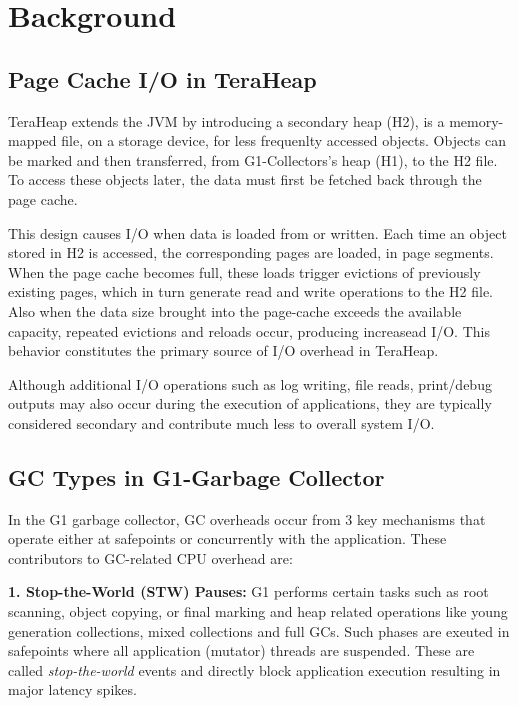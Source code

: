 \section{Background}


\subsection{Page Cache I/O in TeraHeap}


TeraHeap extends the JVM by introducing a secondary heap (H2), is a memory-mapped file,
on a storage device, for less frequenlty accessed objects.
Objects can be marked and then transferred, from G1-Collectors's heap (H1), to the H2 file.
To access these objects later, the data must first be fetched back through the page cache.

This design causes I/O when data is loaded from or written. Each time an object stored in H2 is
accessed, the corresponding pages are loaded, in page segments. When the page cache becomes full,
these loads trigger evictions of previously existing pages, which in turn
generate read and write operations to the H2 file. Also when the data size 
brought into the page-cache exceeds the available capacity, repeated evictions
and reloads occur, producing increasead I/O. This behavior constitutes the
primary source of I/O overhead in TeraHeap.

Although additional I/O operations such as log writing, file reads, print/debug
outputs may also occur during the execution of applications, they are typically
considered secondary and contribute much less to overall system I/O.

\subsection{GC Types in G1-Garbage Collector}
In the G1 garbage collector, GC overheads occur from 3 key
mechanisms that operate either at safepoints or concurrently with the application.
These contributors to GC-related CPU overhead are:

\textbf{1. Stop-the-World (STW) Pauses:}  
G1 performs certain tasks such as root scanning, object copying, or final marking and heap related operations
like young generation collections, mixed collections and full GCs. Such phases are exeuted in safepoints
where all application (mutator) threads are suspended. These are called \emph{stop-the-world} events and
directly block application execution resulting in major latency spikes.

